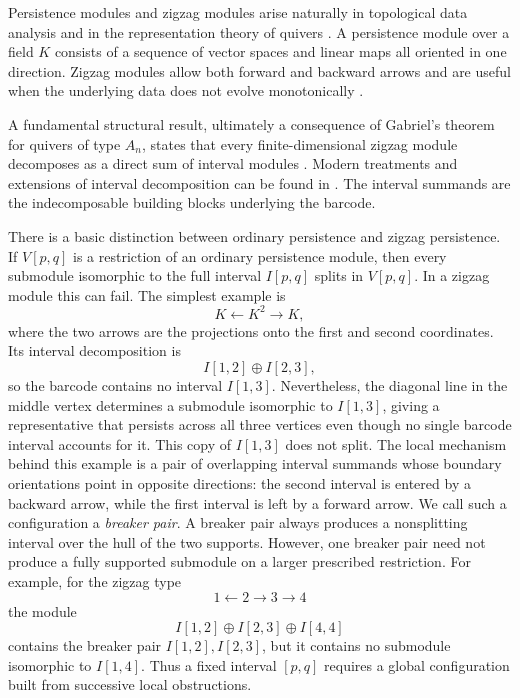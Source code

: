 \documentclass[11pt]{amsart}
\numberwithin{equation}{section}
\theoremstyle{definition}
\begin{document}
Persistence modules and zigzag modules arise naturally in topological data
analysis and in the representation theory of quivers
\cite{AuslanderReitenSmalo,CarlssonSurvey,EdelsbrunnerHarer,Oudot}.  A
persistence module over a field $K$ consists of a sequence of vector spaces
and linear maps all oriented in one direction.  Zigzag modules allow both
forward and backward arrows and are useful when the underlying data does not
evolve monotonically \cite{CarlssonDeSilvaZigzag}.

A fundamental structural result, ultimately a consequence of Gabriel's
theorem for quivers of type $A_n$, states that every finite-dimensional
zigzag module decomposes as a direct sum of interval modules
\cite{Gabriel,CarlssonDeSilvaZigzag}.  Modern treatments and extensions of
interval decomposition can be found in
\cite{Botnan2017,BotnanCrawleyBoevey2020,CrawleyBoevey}.  The interval
summands are the indecomposable building blocks underlying the barcode.

There is a basic distinction between ordinary persistence and zigzag
persistence.  If $V[p,q]$ is a restriction of an ordinary persistence module,
then every submodule isomorphic to the full interval $I[p,q]$ splits in
$V[p,q]$.  In a zigzag module this can fail.  The simplest example is
\[
K \longleftarrow K^2 \longrightarrow K,
\]
where the two arrows are the projections onto the first and second
coordinates. Its interval decomposition is
\[
I[1,2]\oplus I[2,3],
\]
so the barcode contains no interval $I[1,3]$. Nevertheless, the diagonal
line in the middle vertex determines a submodule isomorphic to $I[1,3]$,
giving a representative that persists across all three vertices even though
no single barcode interval accounts for it. This copy of $I[1,3]$ does not
split.
The local mechanism behind this example is a pair of overlapping interval
summands whose boundary orientations point in opposite directions: the
second interval is entered by a backward arrow, while the first interval is
left by a forward arrow.  We call such a configuration a \emph{breaker
pair}.  A breaker pair always produces a nonsplitting interval over the hull
of the two supports.  However, one breaker pair need not produce a fully
supported submodule on a larger prescribed restriction.  For example, for
the zigzag type
\[
1\longleftarrow 2\longrightarrow 3\longrightarrow 4
\]
the module
\[
I[1,2]\oplus I[2,3]\oplus I[4,4]
\]
contains the breaker pair $I[1,2],I[2,3]$, but it contains no submodule
isomorphic to $I[1,4]$.  Thus a fixed interval $[p,q]$ requires a global
configuration built from successive local obstructions.
\end{document}

